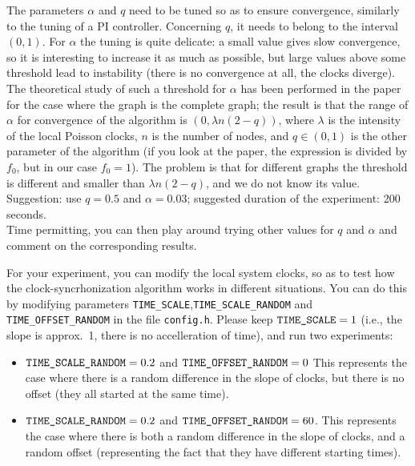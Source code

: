 \documentclass{article}
\begin{document}
The parameters $\alpha$ and $q$ need to be tuned so as to ensure convergence, similarly to the tuning of a PI controller.
Concerning $q$, it needs to belong to the interval $(0,1)$. For $\alpha$ the tuning is quite delicate: a small value gives slow convergence, so it is interesting to increase it as much as possible, but large values above some threshold lead to instability (there is no convergence at all, the clocks diverge). The theoretical study of such a threshold for $\alpha$ has been performed in the paper \cite{RandSync-journal} for the case where the graph is the complete graph; the result is that the range of $\alpha$ for convergence of the algorithm is $(0, \lambda n (2-q))$, where $\lambda$ is the intensity of the local Poisson clocks, $n$ is the number of nodes, and $q \in (0,1) $ is the other parameter of the algorithm (if you look at the paper, the expression is divided by $f_0$, but in our case $f_0=1$). The problem is that for different graphs the threshold is different and smaller than $\lambda n (2-q)$, and we do not know its value. \\
Suggestion: use $q=0.5$ and $\alpha = 0.03$; suggested duration of the experiment: 200 seconds.\\
Time permitting, you can then play around trying other values for $q$ and $\alpha$ and comment on the corresponding results.


For your experiment, you can modify the local system clocks, so as to test how the clock-syncrhonization algorithm works in different situations. You can do this by modifying parameters \verb=TIME_SCALE=,\verb=TIME_SCALE_RANDOM= and \verb=TIME_OFFSET_RANDOM= in the file \verb=config.h=. Please keep $\verb=TIME_SCALE= = 1$ (i.e., the slope is approx.~1, there is no accelleration of time), and run two experiments:
\begin{itemize}
\item
$\verb=TIME_SCALE_RANDOM= =0.2 $ and $ \verb=TIME_OFFSET_RANDOM= = 0$
This represents the case where there is a random difference in the slope of clocks, but there is no offset (they all started at the same time).
\item
$\verb=TIME_SCALE_RANDOM= =0.2 $ and $ \verb=TIME_OFFSET_RANDOM= = 60$.
This represents the case where there is both a random difference in the slope of clocks, and a random offset (representing the fact that they have different starting times).
\end{itemize}
\end{document}

